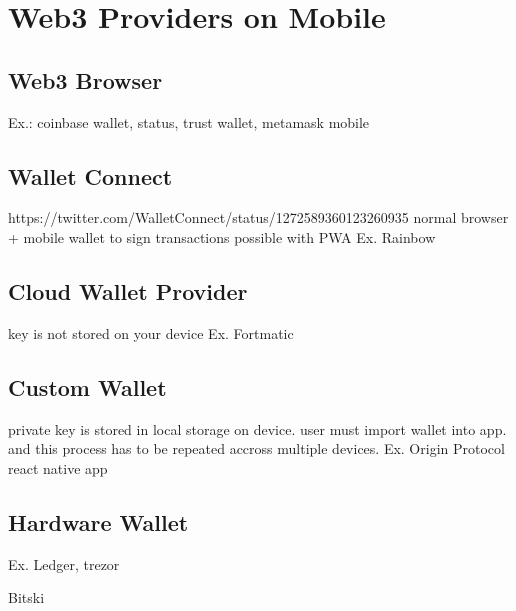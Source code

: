 \section{Web3 Providers on Mobile}

\subsection{Web3 Browser}
Ex.: coinbase wallet, status, trust wallet, metamask mobile

\subsection{Wallet Connect}
https://twitter.com/WalletConnect/status/1272589360123260935
normal browser + mobile wallet to sign transactions
possible with PWA
Ex. Rainbow

\subsection{Cloud Wallet Provider}
key is not stored on your device
Ex. Fortmatic


\subsection{Custom Wallet}
private key is stored in local storage on device. user must import wallet into app. and this process has to be repeated accross multiple devices. 
Ex. Origin Protocol react native app

\subsection{Hardware Wallet}
Ex. Ledger, trezor


Bitski